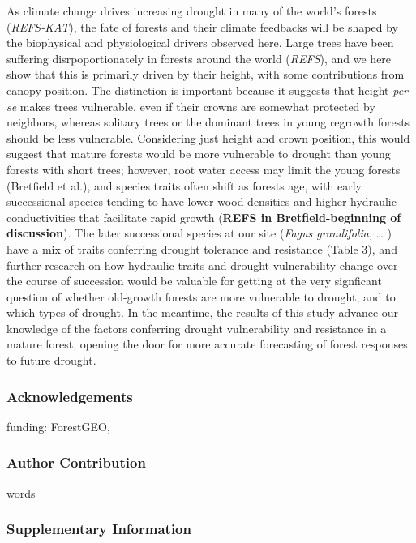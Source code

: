 \documentclass[]{article}
\begin{document}
As climate change drives increasing drought in many of the world's
forests (\emph{REFS-KAT}), the fate of forests and their climate
feedbacks will be shaped by the biophysical and physiological drivers
observed here. Large trees have been suffering disrpoportionately in
forests around the world (\emph{REFS}), and we here show that this is
primarily driven by their height, with some contributions from canopy
position. The distinction is important because it suggests that height
\emph{per se} makes trees vulnerable, even if their crowns are somewhat
protected by neighbors, whereas solitary trees or the dominant trees in
young regrowth forests should be less vulnerable. Considering just
height and crown position, this would suggest that mature forests would
be more vulnerable to drought than young forests with short trees;
however, root water access may limit the young forests (Bretfield et
al.), and species traits often shift as forests age, with early
successional species tending to have lower wood densities and higher
hydraulic conductivities that facilitate rapid growth (\textbf{REFS in
Bretfield-beginning of discussion}). The later successional species at
our site (\emph{Fagus grandifolia}, \ldots{} ) have a mix of traits
conferring drought tolerance and resistance (Table 3), and further
research on how hydraulic traits and drought vulnerability change over
the course of succession would be valuable for getting at the very
signficant question of whether old-growth forests are more vulnerable to
drought, and to which types of drought. In the meantime, the results of
this study advance our knowledge of the factors conferring drought
vulnerability and resistance in a mature forest, opening the door for
more accurate forecasting of forest responses to future drought.

\hypertarget{acknowledgements}{%
\subsubsection{Acknowledgements}\label{acknowledgements}}

funding: ForestGEO,

\hypertarget{author-contribution}{%
\subsubsection{Author Contribution}\label{author-contribution}}

words

\newpage

\hypertarget{supplementary-information}{%
\subsubsection{Supplementary
Information}\label{supplementary-information}}
\end{document}
